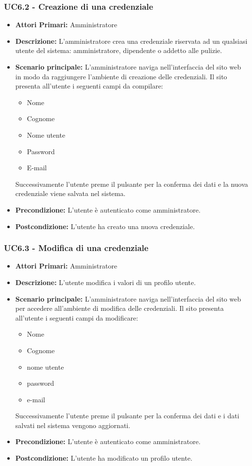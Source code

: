 \subsubsection{ UC6.2 - Creazione di una credenziale}
\begin{itemize}
	\item\textbf{Attori Primari:}
	Amministratore 
	\item\textbf{Descrizione:} 
	L'amministratore crea una credenziale riservata ad un qualsiasi utente del sistema: amministratore, dipendente o addetto alle pulizie.
	\item\textbf{Scenario principale:} 
	L'amministratore naviga nell'interfaccia del sito web in modo da raggiungere l'ambiente di creazione delle credenziali.
	Il sito presenta all'utente i seguenti campi da compilare:
	\begin{itemize}
		\item Nome
		\item Cognome
		\item Nome utente
		\item Password
		\item E-mail
	\end{itemize}
	Successivamente l'utente preme il pulsante per la conferma dei dati e la nuova credenziale viene salvata nel sistema.
	\item\textbf{Precondizione:} 
	L'utente è autenticato come amministratore.
	\item\textbf{Postcondizione:}
	L'utente ha creato una nuova credenziale.
\end{itemize}

\subsubsection{ UC6.3 - Modifica di una credenziale}
\begin{itemize}
	\item\textbf{Attori Primari:} 
	Amministratore
	\item\textbf{Descrizione:} 
	L'utente modifica i valori di un profilo utente.
	\item\textbf{Scenario principale:} 
	L'amministratore naviga nell'interfaccia del sito web per accedere all'ambiente di modifica delle credenziali.
	Il sito presenta all'utente i seguenti campi da modificare:
	\begin{itemize}
		\item Nome
		\item Cognome
		\item nome utente
		\item password
		\item e-mail
	\end{itemize}
	Successivamente l'utente preme il pulsante per la conferma dei dati e i dati salvati nel sistema vengono aggiornati.
	\item\textbf{Precondizione:} 
	L'utente è autenticato come amministratore.
	\item\textbf{Postcondizione:}
	L'utente ha modificato un profilo utente.
\end{itemize}

